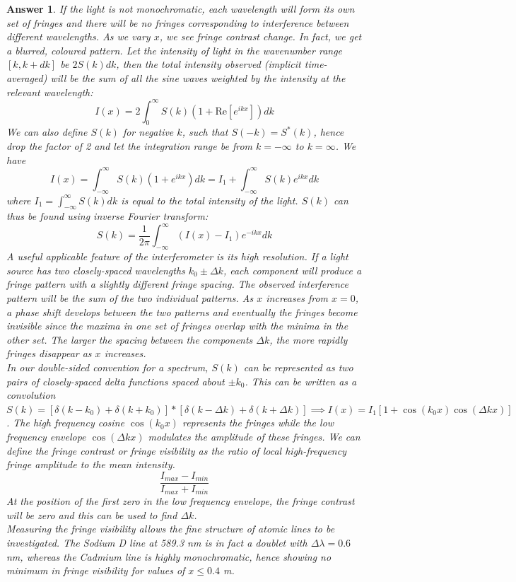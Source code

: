 \documentclass[a4paper]{article}
\newtheorem{ans}{Answer}[subsection]
\theoremstyle{new}
\begin{document}
\begin{ans}
If the light is not monochromatic, each wavelength will form its own set of fringes and there will be no fringes corresponding to interference between different wavelengths. As we vary $x$, we see fringe contrast change. In fact, we get a blurred, coloured pattern. Let the intensity of light in the wavenumber range $[k,k+dk]$ be $2S(k)dk$, then the total intensity observed (implicit time-averaged) will be the sum of all the sine waves weighted by the intensity at the relevant wavelength:
$$I(x)=2\int_0^\infty S(k)(1+\text{Re}[e^{ikx}])dk$$
We can also define $S(k)$ for negative $k$, such that $S(-k)=S^*(k)$, hence drop the factor of 2 and let the integration range be from $k=-\infty$ to $k=\infty$. We have
$$I(x)=\int_{-\infty}^\infty S(k)(1+e^{ikx})dk=I_1+\int_{-\infty}^\infty S(k)e^{ikx}dk$$
where $I_1=\int_{-\infty}^\infty S(k)dk$ is equal to the total intensity of the light. $S(k)$ can thus be found using inverse Fourier transform:
$$S(k)=\frac{1}{2\pi}\int_{-\infty}^\infty(I(x)-I_1)e^{-ikx}dk$$
A useful applicable feature of the interferometer is its high resolution. If a light source has two closely-spaced wavelengths $k_0\pm\Delta k$, each component will produce a fringe pattern with a slightly different fringe spacing. The observed interference pattern will be the sum of the two individual patterns. As $x$ increases from $x=0$, a phase shift develops between the two patterns and eventually the fringes become invisible since the maxima in one set of fringes overlap with the minima in the other set. The larger the spacing between the components $\Delta k$, the more rapidly fringes disappear as $x$ increases.\\[5pt]
In our double-sided convention for a spectrum, $S(k)$ can be represented as two pairs of closely-spaced delta functions spaced about $\pm k_0$. This can be written as a convolution $S(k)=[\delta(k-k_0)+\delta(k+k_0)]*[\delta(k-\Delta k)+\delta(k+\Delta k)]\implies I(x)=I_1[1+\cos(k_0x)\cos(\Delta kx)]$. The high frequency cosine $\cos(k_0x)$ represents the fringes while the low frequency envelope $\cos(\Delta kx)$ modulates the amplitude of these fringes. We can define the fringe contrast or fringe visibility as the ratio of local high-frequency fringe amplitude to the mean intensity.
$$\frac{I_{max}-I_{min}}{I_{max}+I_{min}}$$
At the position of the first zero in the low frequency envelope, the fringe contrast will be zero and this can be used to find $\Delta k$.\\[5pt]
Measuring the fringe visibility allows the fine structure of atomic lines to be investigated. The Sodium D line at 589.3 nm is in fact a doublet with $\Delta\lambda=0.6$ nm, whereas the Cadmium line is highly monochromatic, hence showing no minimum in fringe visibility for values of $x\leq 0.4$ m.
\end{ans}
\end{document}
